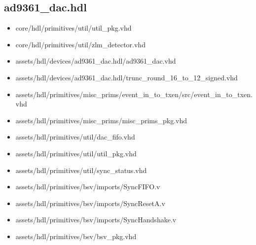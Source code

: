 \documentclass{article}
\def\comp{ad9361\_dac}
\begin{document}
\subsection*{\comp.hdl}
\begin{itemize}
	\item core/hdl/primitives/util/util\_pkg.vhd
	\item core/hdl/primitives/util/zlm\_detector.vhd
	\item assets/hdl/devices/ad9361\_dac.hdl/ad9361\_dac.vhd
	\item assets/hdl/devices/ad9361\_dac.hdl/trunc\_round\_16\_to\_12\_signed.vhd
	\item assets/hdl/primitives/misc\_prims/event\_in\_to\_txen/src/event\_in\_to\_txen.vhd
	\item assets/hdl/primitives/misc\_prims/misc\_prims\_pkg.vhd
	\item assets/hdl/primitives/util/dac\_fifo.vhd
	\item assets/hdl/primitives/util/util\_pkg.vhd
	\item assets/hdl/primitives/util/sync\_status.vhd
	\item assets/hdl/primitives/bsv/imports/SyncFIFO.v
	\item assets/hdl/primitives/bsv/imports/SyncResetA.v
	\item assets/hdl/primitives/bsv/imports/SyncHandshake.v
	\item assets/hdl/primitives/bsv/bsv\_pkg.vhd
\end{itemize}
\end{document}
